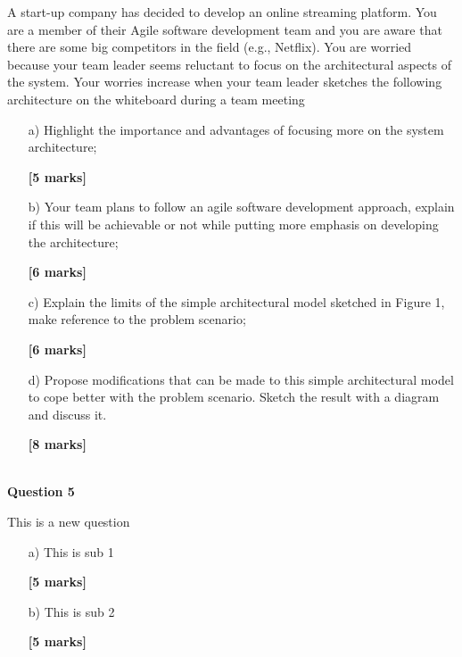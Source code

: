 \documentclass[11pt]{article}
\begin{document}
          A start-up company has decided to develop an online streaming platform. You are a member of their Agile software development team and you are aware that there are some big competitors in the field (e.g., Netflix). You are worried because your team leader seems reluctant to focus on the architectural aspects of the system. Your worries increase when your team leader sketches the following architecture on the whiteboard during a team meeting
        \begin{enumerate}
            
        \item[a) ]Highlight the importance and advantages of focusing more on the system architecture;
        \begin{flushright}
            \textbf{[5 marks]}
        \end{flushright}
    
        \item[b) ]Your team plans to follow an agile software development approach, explain if this will be achievable or not while putting more emphasis on developing the architecture;
        \begin{flushright}
            \textbf{[6 marks]}
        \end{flushright}
    
        \item[c) ]Explain the limits of the simple architectural model sketched in Figure 1, make reference to the problem scenario;
        \begin{flushright}
            \textbf{[6 marks]}
        \end{flushright}
    
        \item[d) ]Propose modifications that can be made to this simple architectural model to cope better with the problem scenario. Sketch the result with a diagram and discuss it.
        \begin{flushright}
            \textbf{[8 marks]}
        \end{flushright}
    
        \end{enumerate}
        ~\\
    
        \textbf{Question 5}

        This is a new question
        \begin{enumerate}
            
        \item[a) ]This is sub 1
        \begin{flushright}
            \textbf{[5 marks]}
        \end{flushright}
    
        \item[b) ]This is sub 2
        \begin{flushright}
            \textbf{[5 marks]}
        \end{flushright}
    
        \end{enumerate}
        ~\\
    
\end{document}
